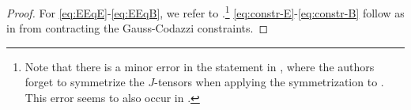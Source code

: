 \documentclass[11pt,leqno,textwidth=10cm]{amsart}
\numberwithin{equation}{section}
\theoremstyle{definition}
\theoremstyle{plain}
\newcommand{\1}{\mathbbm{1}}
\newcommand{\g}{\overline{g}}
\newcommand{\nabbar}{\overline{\nabla}}
\newcommand{\Ric}{\text{\normalfont{Ric}}}
\newcommand{\del}{\partial}
\newcommand{\change}[1]{\color{black}#1\color{black}}
\begin{document}
\begin{proof}
For \eqref{eq:EEqE}-\eqref{eq:EEqB}, we refer to \cite[(3.11a)-(3.11b)]{AM03}.\change{\footnote{\change{Note that there is a minor error in the statement in \cite{AM03}, where the authors forget to symmetrize the $J$-tensors when applying the symmetrization to \cite[(3.14)]{AM03}. This error seems to also occur in \cite[(7.2.2jk)]{ChrKl93}.}} } \eqref{eq:constr-E}-\eqref{eq:constr-B} follow as in \cite[(3.63a)-(3.63b)]{Wang19} from contracting the Gauss-Codazzi constraints.

\end{proof}
\end{document}
